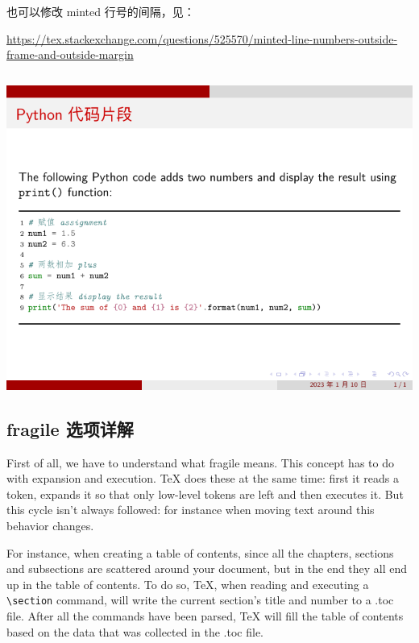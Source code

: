 也可以修改 minted 行号的间隔，见：

\url{https://tex.stackexchange.com/questions/525570/minted-line-numbers-outside-frame-and-outside-margin}

\inputminted[linenos=true]{latex}{examples/beamer/code-listing-change-numbersep.tex}

\includegraphics{examples/beamer/code-listing-change-numbersep.pdf}

\subsection{{\ttfamily fragile} 选项详解}

First of all, we have to understand what {\ttfamily fragile} means. This concept has to do with expansion and execution. {\TeX} does these at the same time: first it reads a token, expands it so that only low-level tokens are left and then executes it. But this cycle isn’t always followed: for instance when moving text around this behavior changes.

For instance, when creating a table of contents, since all the chapters, sections and subsections are scattered around your document, but in the end they all end up in the table of contents. To do so, {\TeX}, when reading and executing a \verb|\section| command, will write the current section’s title and number to a .toc file. After all the commands have been parsed, {\TeX} will fill the table of contents based on the data that was collected in the .toc file.

